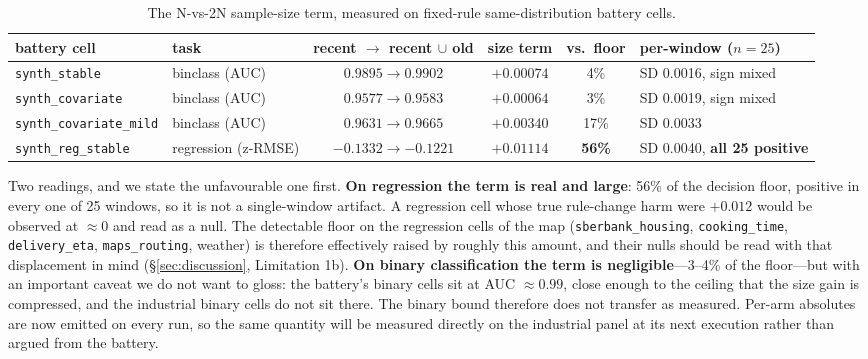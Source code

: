\documentclass[10pt]{article} %
\begin{document}
\begin{table}[h]
\caption{The N-vs-2N sample-size term, measured on fixed-rule same-distribution battery cells.}
\label{tab:sizeterm}
\centering
\scriptsize
\setlength{\tabcolsep}{4pt}
\begin{tabular}{@{}llccc>{\raggedright\arraybackslash}p{1.35in}@{}}
\toprule
battery cell & task & recent $\to$ recent $\cup$ old & size term & vs.\ floor & per-window ($n = 25$) \\
\midrule
\texttt{synth\_stable} & binclass (AUC) & $0.9895 \to 0.9902$ & $\mathbf{+0.00074}$ & 4\% & SD 0.0016, sign mixed \\
\texttt{synth\_covariate} & binclass (AUC) & $0.9577 \to 0.9583$ & $+0.00064$ & 3\% & SD 0.0019, sign mixed \\
\texttt{synth\_covariate\_mild} & binclass (AUC) & $0.9631 \to 0.9665$ & $+0.00340$ & 17\% & SD 0.0033 \\
\texttt{synth\_reg\_stable} & regression (z-RMSE) & $-0.1332 \to -0.1221$ & $\mathbf{+0.01114}$ & \textbf{56\%} & SD 0.0040, \textbf{all 25 positive} \\
\bottomrule
\end{tabular}
\end{table}

Two readings, and we state the unfavourable one first. \textbf{On regression the term is real and
large}: 56\% of the decision floor, positive in every one of 25 windows, so it is not a
single-window artifact. A regression cell whose true rule-change harm were $+0.012$ would be
observed at ${\approx}0$ and read as a null. The detectable floor on the regression cells of the
map (\texttt{sberbank\_housing}, \texttt{cooking\_time}, \texttt{delivery\_eta},
\texttt{maps\_routing}, weather) is therefore effectively raised by roughly this amount, and their
nulls should be read with that displacement in mind (\S\ref{sec:discussion}, Limitation 1b).
\textbf{On binary classification the term is negligible}---3--4\% of the floor---but with an
important caveat we do not want to gloss: the battery's binary cells sit at AUC ${\approx}0.99$,
close enough to the ceiling that the size gain is compressed, and the industrial binary cells do
not sit there. The binary bound therefore does not transfer as measured. Per-arm absolutes are now
emitted on every run, so the same quantity will be measured directly on the industrial panel at
its next execution rather than argued from the battery.
\end{document}

